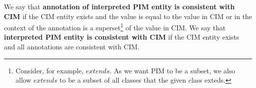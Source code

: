 






\begin{definition}[consistency]
    We say that \textbf{annotation of interpreted PIM entity is consistent with CIM} if the CIM entity exists and the value is equal to the value in CIM or in the context of the annotation is a superset\footnote{Consider, for example, $extends$. As we want PIM to be a subset, we also allow $extends$ to be a subset of all classes that the given class exteds.} of the value in CIM. We say that \textbf{interpreted PIM entity is consistent with CIM} if the CIM entity exists and all annotations are consistent with CIM.
\end{definition}

